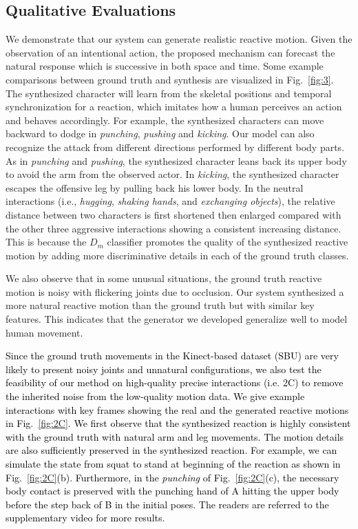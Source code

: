 \documentclass[times,twocolumn,final]{elsarticle}
\begin{document}
\subsection{Qualitative Evaluations}
\label{sec:4.1}
We demonstrate that our system can generate realistic reactive motion. Given the observation of an intentional action, the proposed mechanism can forecast the natural response which is successive in both space and time. Some example comparisons between ground truth and synthesis are visualized in Fig.~\ref{fig:3}. The synthesized character will learn from the skeletal positions and temporal synchronization for a reaction, which imitates how a human perceives an action and behaves accordingly. For example, the synthesized characters can move backward to dodge in \emph{punching}, \emph{pushing} and \emph{kicking}. Our model can also recognize the attack from different directions performed by different body parts. As in \emph{punching} and \emph{pushing}, the synthesized character leans back its upper body to avoid the arm from the observed actor. In \emph{kicking}, the synthesized character escapes the offensive leg by pulling back his lower body. In the neutral interactions (i.e., \emph{hugging}, \emph{shaking hands}, and \emph{exchanging objects}), the relative distance between two characters is first shortened then enlarged compared with the other three aggressive interactions showing a consistent increasing distance. This is because the $D_{m}$ classifier promotes the quality of the synthesized reactive motion by adding more discriminative details in each of the ground truth classes.

We also observe that in some unusual situations, the ground truth reactive motion is noisy with flickering joints due to occlusion. Our system synthesized a more natural reactive motion than the ground truth but with similar key features. This indicates that the generator we developed generalize well to model human movement. 

\textcolor{black}{Since the ground truth movements in the Kinect-based dataset (SBU) are very likely to present noisy joints and unnatural configurations, we also test the feasibility of our method on high-quality precise interactions (i.e. 2C) to remove the inherited noise from the low-quality motion data. We give example interactions with key frames showing the real and the generated reactive motions in Fig.~\ref{fig:2C}. We first observe that the synthesized reaction is highly consistent with the ground truth with natural arm and leg movements. The motion details are also sufficiently preserved in the synthesized reaction. For example, we can simulate the state from squat to stand at beginning of the reaction as shown in Fig.~\ref{fig:2C}(b). Furthermore, in the \emph{punching} of Fig.~\ref{fig:2C}(c), the necessary body contact is preserved with the punching hand of A hitting the upper body before the step back of B in the initial poses. The readers are referred to the supplementary video for more results.}%
\end{document}
